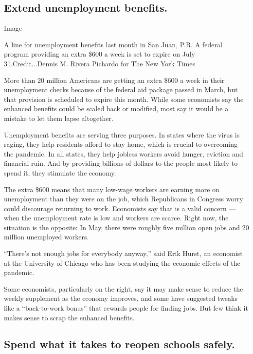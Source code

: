 \hypertarget{extend-unemployment-benefits}{%
\subsection{Extend unemployment
benefits.}\label{extend-unemployment-benefits}}

Image

A line for unemployment benefits last month in San Juan, P.R. A federal
program providing an extra \$600 a week is set to expire on July
31.Credit...Dennis M. Rivera Pichardo for The New York Times

More than 20 million Americans are getting an extra \$600 a week in
their unemployment checks because of the federal aid package passed in
March, but that provision is scheduled to expire this month. While some
economists say the enhanced benefits could be scaled back or modified,
most say it would be a mistake to let them lapse altogether.

Unemployment benefits are serving three purposes. In states where the
virus is raging, they help residents afford to stay home, which is
crucial to overcoming the pandemic. In all states, they help jobless
workers avoid hunger, eviction and financial ruin. And by providing
billions of dollars to the people most likely to spend it, they
stimulate the economy.

The extra \$600 means that many low-wage workers are earning more on
unemployment than they were on the job, which Republicans in Congress
worry could discourage returning to work. Economists say that is a valid
concern --- when the unemployment rate is low and workers are scarce.
Right now, the situation is the opposite: In May, there were roughly
five million open jobs and 20 million unemployed workers.

``There's not enough jobs for everybody anyway,'' said Erik Hurst, an
economist at the University of Chicago who has been studying the
economic effects of the pandemic.

Some economists, particularly on the right, say it may make sense to
reduce the weekly supplement as the economy improves, and some have
suggested tweaks like a ``back-to-work bonus'' that rewards people for
finding jobs. But few think it makes sense to scrap the enhanced
benefits.

\hypertarget{spend-what-it-takes-to-reopen-schools-safely}{%
\subsection{Spend what it takes to reopen schools
safely.}\label{spend-what-it-takes-to-reopen-schools-safely}}

